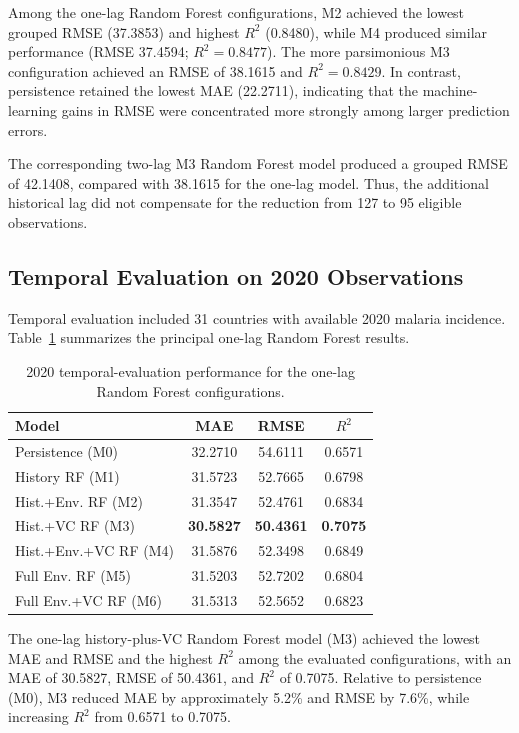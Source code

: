 \documentclass[10pt,twocolumn]{article}
\begin{document}
Among the one-lag Random Forest configurations, M2 achieved the lowest
grouped RMSE (37.3853) and highest \(R^2\) (0.8480), while M4 produced
similar performance (RMSE 37.4594; \(R^2=0.8477\)). The more
parsimonious M3 configuration achieved an RMSE of 38.1615 and
\(R^2=0.8429\). In contrast, persistence retained the lowest MAE
(22.2711), indicating that the machine-learning gains in RMSE were
concentrated more strongly among larger prediction errors.

The corresponding two-lag M3 Random Forest model produced a grouped
RMSE of 42.1408, compared with 38.1615 for the one-lag model. Thus,
the additional historical lag did not compensate for the reduction
from 127 to 95 eligible observations.


\subsection{Temporal Evaluation on 2020 Observations}

Temporal evaluation included 31 countries with available 2020 malaria
incidence. Table~\ref{tab:temporal_results} summarizes the principal
one-lag Random Forest results.

\begin{table}[!t]
\centering
\caption{2020 temporal-evaluation performance for the one-lag Random
Forest configurations.}
\label{tab:temporal_results}
\small
\setlength{\tabcolsep}{4pt}
\begin{tabular}{lccc}
\toprule
Model & MAE & RMSE & $R^2$ \\
\midrule
Persistence (M0)      & 32.2710 & 54.6111 & 0.6571 \\
History RF (M1)       & 31.5723 & 52.7665 & 0.6798 \\
Hist.+Env. RF (M2)    & 31.3547 & 52.4761 & 0.6834 \\
Hist.+VC RF (M3)      & \textbf{30.5827} & \textbf{50.4361} & \textbf{0.7075} \\
Hist.+Env.+VC RF (M4) & 31.5876 & 52.3498 & 0.6849 \\
Full Env. RF (M5)     & 31.5203 & 52.7202 & 0.6804 \\
Full Env.+VC RF (M6)  & 31.5313 & 52.5652 & 0.6823 \\
\bottomrule
\end{tabular}
\end{table}

The one-lag history-plus-VC Random Forest model (M3) achieved the
lowest MAE and RMSE and the highest \(R^2\) among the evaluated
configurations, with an MAE of 30.5827, RMSE of 50.4361, and
\(R^2\) of 0.7075. Relative to persistence (M0), M3 reduced MAE by
approximately 5.2\% and RMSE by 7.6\%, while increasing \(R^2\) from
0.6571 to 0.7075.
\end{document}
